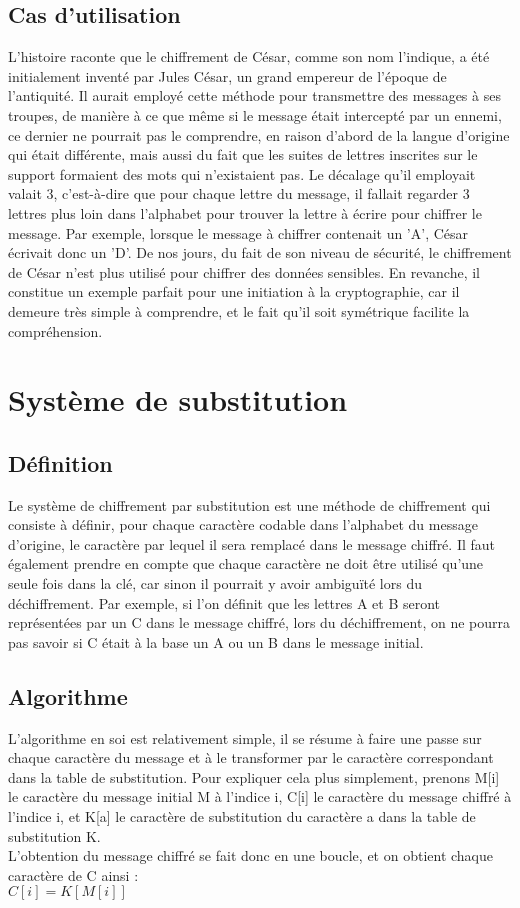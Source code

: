 		\subsection{Cas d'utilisation}
			L'histoire raconte que le chiffrement de César, comme son nom l'indique, a été initialement inventé par Jules César, un grand empereur de l'époque de l'antiquité. Il aurait employé cette méthode pour transmettre des messages à ses troupes, de manière à ce que même si le message était intercepté par un ennemi, ce dernier ne pourrait pas le comprendre, en raison d'abord de la langue d'origine qui était différente, mais aussi du fait que les suites de lettres inscrites sur le support formaient des mots qui n'existaient pas. Le décalage qu'il employait valait 3, c'est-à-dire que pour chaque lettre du message, il fallait regarder 3 lettres plus loin dans l'alphabet pour trouver la lettre à écrire pour chiffrer le message. Par exemple, lorsque le message à chiffrer contenait un 'A', César écrivait donc un 'D'.
			De nos jours, du fait de son niveau de sécurité, le chiffrement de César n'est plus utilisé pour chiffrer des données sensibles. En revanche, il constitue un exemple parfait pour une initiation à la cryptographie, car il demeure très simple à comprendre, et le fait qu'il soit symétrique facilite la compréhension.
	\section{Système de substitution}
		\subsection{Définition}
			Le système de chiffrement par substitution est une méthode de chiffrement qui consiste à définir, pour chaque caractère codable dans l'alphabet du message d'origine, le caractère par lequel il sera remplacé dans le message chiffré. Il faut également prendre en compte que chaque caractère ne doit être utilisé qu'une seule fois dans la clé, car sinon il pourrait y avoir ambiguïté lors du déchiffrement. Par exemple, si l'on définit que les lettres A et B seront représentées par un C dans le message chiffré, lors du déchiffrement, on ne pourra pas savoir si C était à la base un A ou un B dans le message initial.
		\subsection{Algorithme}
			L'algorithme en soi est relativement simple, il se résume à faire une passe sur chaque caractère du message et à le transformer par le caractère correspondant dans la table de substitution. Pour expliquer cela plus simplement, prenons M[i] le caractère du message initial M à l'indice i, C[i] le caractère du message chiffré à l'indice i, et K[a] le caractère de substitution du caractère a dans la table de substitution K.\\
			L'obtention du message chiffré se fait donc en une boucle, et on obtient chaque caractère de C ainsi :\\
			$C[i] = K[M[i]]$
